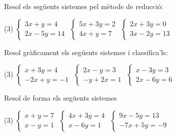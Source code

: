 \begin{mylist}


\exer  Resol els següents sistemes pel mètode de reducció:

\begin{tasks}(3)
	\task  $\left\{\begin{array}{c} {3x+y=4} \\ {2x-5y=14} \end{array}\right. $   
	\task  $\left\{\begin{array}{c} {5x+3y=2} \\ {4x+y=7} \end{array}\right. $   
	\task  $\left\{\begin{array}{c} {2x+3y=0} \\ {3x-2y=13} \end{array}\right. $
\end{tasks}


\exer  Resol gràficament els següents sistemes i classifica'ls:

\begin{tasks}(3)
	\task  $\left\{\begin{array}{c} {x+3y=4} \\ {-2x+y=-1} \end{array}\right. $   
	\task  $\left\{\begin{array}{c} {2x-y=3} \\ {-y+2x=1} \end{array}\right. $  
	\task  $\left\{\begin{array}{c} {x-3y=3} \\ {2x-6y=6} \end{array}\right. $
\end{tasks}


\exer  Resol de forma  els següents sistemes 

\begin{tasks}(3)
	\task  $\left\{\begin{array}{c} {x+y=7} \\ {x-y=1} \end{array}\right. $   
	\task  $\left\{\begin{array}{c} {4x+3y=4} \\ {x-6y=1} \end{array}\right. $  
	\task  $\left\{\begin{array}{c} {9x-5y=13} \\ {-7x+5y=-9} \end{array}\right. $
\end{tasks}
\answers{[$(4,3)$, $(1,0)$, $(2,1)$]}

\end{mylist}


